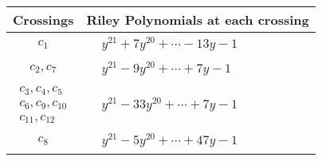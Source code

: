 \documentclass[1p]{elsarticle_modified}
\theoremstyle{definition}
\begin{document}
\begin{tabular}{m{50pt}|m{274pt}}
Crossings & \hspace{64pt}Riley Polynomials at each crossing \\
\hline $$\begin{aligned}c_{1}\end{aligned}$$&$\begin{aligned}
&y^{21}+7 y^{20}+\cdots-13 y-1
\end{aligned}$\\
\hline $$\begin{aligned}c_{2},c_{7}\end{aligned}$$&$\begin{aligned}
&y^{21}-9 y^{20}+\cdots+7 y-1
\end{aligned}$\\
\hline $$\begin{aligned}c_{3},c_{4},c_{5}\\c_{6},c_{9},c_{10}\\c_{11},c_{12}\end{aligned}$$&$\begin{aligned}
&y^{21}-33 y^{20}+\cdots+7 y-1
\end{aligned}$\\
\hline $$\begin{aligned}c_{8}\end{aligned}$$&$\begin{aligned}
&y^{21}-5 y^{20}+\cdots+47 y-1
\end{aligned}$\\
\hline
\end{tabular}
\vskip 2pc
\end{document}
